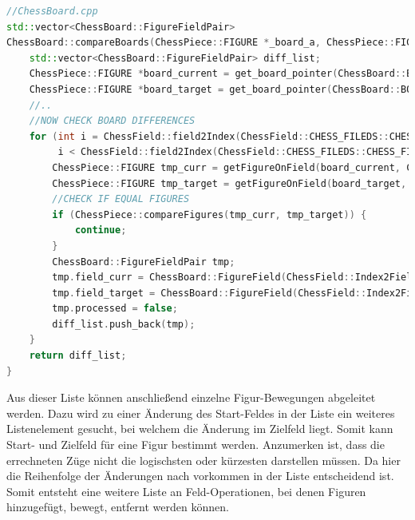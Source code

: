 \begin{lstlisting}[language={C++}]
//ChessBoard.cpp
std::vector<ChessBoard::FigureFieldPair>
ChessBoard::compareBoards(ChessPiece::FIGURE *_board_a, ChessPiece::FIGURE *_board_b, bool _include_park_pos) {
    std::vector<ChessBoard::FigureFieldPair> diff_list;
    ChessPiece::FIGURE *board_current = get_board_pointer(ChessBoard::BOARD_TPYE::REAL_BOARD);
    ChessPiece::FIGURE *board_target = get_board_pointer(ChessBoard::BOARD_TPYE::TARGET_BOARD);
    //..
    //NOW CHECK BOARD DIFFERENCES
    for (int i = ChessField::field2Index(ChessField::CHESS_FILEDS::CHESS_FIELD_A1);
         i < ChessField::field2Index(ChessField::CHESS_FILEDS::CHESS_FIELD_PARK_POSTION_WHITE_1); i++) {
        ChessPiece::FIGURE tmp_curr = getFigureOnField(board_current, ChessField::Index2Field(i));
        ChessPiece::FIGURE tmp_target = getFigureOnField(board_target, ChessField::Index2Field(i));
        //CHECK IF EQUAL FIGURES
        if (ChessPiece::compareFigures(tmp_curr, tmp_target)) {
            continue;
        }
        ChessBoard::FigureFieldPair tmp;
        tmp.field_curr = ChessBoard::FigureField(ChessField::Index2Field(i), tmp_curr);
        tmp.field_target = ChessBoard::FigureField(ChessField::Index2Field(i), tmp_target);
        tmp.processed = false;
        diff_list.push_back(tmp);
    }
    return diff_list;
}
\end{lstlisting}

Aus dieser Liste können anschließend einzelne Figur-Bewegungen
abgeleitet werden. Dazu wird zu einer Änderung des Start-Feldes in der
Liste ein weiteres Listenelement gesucht, bei welchem die Änderung im
Zielfeld liegt. Somit kann Start- und Zielfeld für eine Figur bestimmt
werden. Anzumerken ist, dass die errechneten Züge nicht die logischsten
oder kürzesten darstellen müssen. Da hier die Reihenfolge der Änderungen
nach vorkommen in der Liste entscheidend ist. Somit entsteht eine
weitere Liste an Feld-Operationen, bei denen Figuren hinzugefügt,
bewegt, entfernt werden können.

